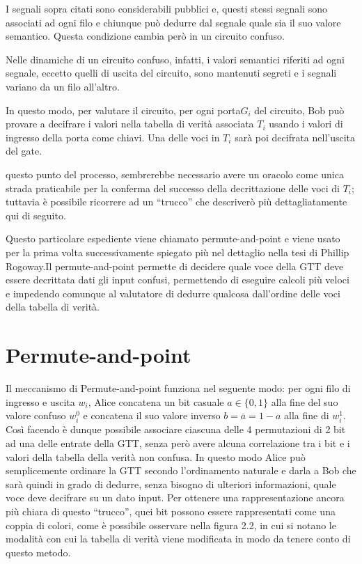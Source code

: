 \documentclass[italian,]{book}
\begin{document}
I segnali sopra citati sono considerabili pubblici e, questi stessi segnali sono associati ad ogni filo e chiunque può dedurre dal segnale quale sia il suo valore semantico. Questa condizione cambia però in un circuito confuso.

Nelle dinamiche di un circuito confuso, infatti, i valori semantici riferiti ad ogni segnale, eccetto quelli di uscita del circuito, sono mantenuti segreti e i segnali variano da un filo all'altro.

In questo modo, per valutare il circuito, per ogni porta\(G_i\) del circuito, Bob può provare a decifrare i valori nella tabella di verità associata \(T_i\) usando i valori di ingresso della porta come chiavi. Una delle voci in \(T_i\) sarà poi decifrata nell'uscita del gate.

questo punto del processo, sembrerebbe necessario avere un oracolo come unica strada praticabile per la conferma del successo della decrittazione delle voci di \(T_i\); tuttavia è possibile ricorrere ad un ``trucco'' che descriverò più dettagliatamente qui di seguito.

Questo particolare espediente viene chiamato permute-and-point e viene usato per la prima volta \citep{fval} successivamente spiegato più nel dettaglio nella tesi di Phillip Rogoway\citep{prog}.Il permute-and-point permette di decidere quale voce della GTT deve essere decrittata dati gli input confusi, permettendo di eseguire calcoli più veloci e impedendo comunque al valutatore di dedurre qualcosa dall'ordine delle voci della tabella di verità.

\newpage

\hypertarget{permute-and-point}{%
\section{Permute-and-point}\label{permute-and-point}}

Il meccanismo di Permute-and-point funziona nel seguente modo: per ogni filo di ingresso e uscita \(w_i\), Alice concatena un bit casuale \(a \in \{0,1\}\) alla fine del suo valore confuso \(w^{0}_i\) e concatena il suo valore inverso \(b = \overline{a} = 1 - a\) alla fine di \(w^{1}_{i}\). Così facendo è dunque possibile associare ciascuna delle 4 permutazioni di 2 bit ad una delle entrate della GTT, senza però avere alcuna correlazione tra i bit e i valori della tabella della verità non confusa. In questo modo Alice può semplicemente ordinare la GTT secondo l'ordinamento naturale e darla a Bob che sarà quindi in grado di dedurre, senza bisogno di ulteriori informazioni, quale voce deve decifrare su un dato input. Per ottenere una rappresentazione ancora più chiara di questo ``trucco'', quei bit possono essere rappresentati come una coppia di colori, come è possibile osservare nella figura 2.2, in cui si notano le modalità con cui la tabella di verità viene modificata in modo da tenere conto di questo metodo.
\end{document}
